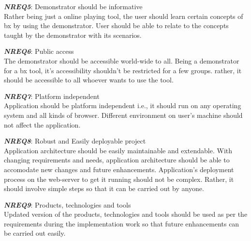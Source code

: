 \textbf{\textit{NREQ5}}: Demonstrator should be informative\\
Rather being just a online playing tool, the user should learn certain concepts of bx by using the demonstrator. User should be able to relate to the concepts taught by the demonstrator with its scenarios.

\textbf{\textit{NREQ6}}: Public access\\
The demonstrator should be accessible world-wide to all. Being a demonstrator for a bx tool, it's accessibility shouldn't be restricted for a few groups. rather, it should be accessible to all whoever wants to use the tool.

\textbf{\textit{NREQ7}}: Platform independent\\ 
Application should be platform independent i.e., it should run on any operating system and all kinds of browser. Different environment on user's machine should not affect the application.

\textbf{\textit{NREQ8}}: Robust and Easily deployable project\\
Application architecture should be easily maintainable and extendable. With changing requirements and needs, application architecture should be able to accomodate new changes and future enhancements. Application's deployment process on the web-server to get it running should not be complex. Rather, it should involve simple steps so that it can be carried out by anyone.

\textbf{\textit{NREQ9}}: Products, technologies and tools\\
Updated version of the products, technologies and tools should be used as per the requirements during the implementation work so that future enhancements can be carried out easily.
